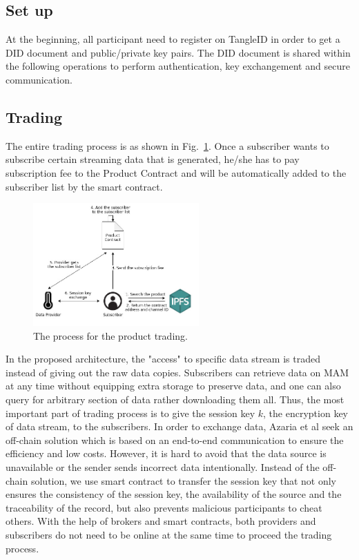 \documentclass[conference]{IEEEtran}
\begin{document}
\subsection{Set up}
At the beginning, all participant need to register on TangleID in order to get a DID document and public/private key pairs. The DID document is shared within the following operations to perform authentication, key exchangement and secure communication. 

\subsection{Trading}
\label{section:trading}

The entire trading process is as shown in Fig.~\ref{fig:trading_product}. Once a subscriber wants to subscribe certain streaming data that is generated, he/she has to pay subscription fee to the Product Contract and will be automatically added to the subscriber list by the smart contract.

\begin{figure}[!t]
    \centering
    \includegraphics[width=2.5in]{trading_product}
    \caption{The process for the product trading.}
    \label{fig:trading_product}
\end{figure}

In the proposed architecture, the "access" to specific data stream is traded instead of giving out the raw data copies. Subscribers can retrieve data on MAM at any time without equipping extra storage to preserve data, and one can also query for arbitrary section of data rather downloading them all. Thus, the most important part of trading process is to give the session key $k$, the encryption key of data stream, to the subscribers. In order to exchange data, Azaria et al\cite{Medrec} seek an off-chain solution which is based on an end-to-end communication to ensure the efficiency and low costs. However, it is hard to avoid that the data source is unavailable or the sender sends incorrect data intentionally. Instead of the off-chain solution, we use smart contract to transfer the session key\cite{3tierDataMarket} that not only ensures the consistency of the session key, the availability of the source and the traceability of the record, but also prevents malicious participants to cheat others. With the help of brokers and smart contracts, both providers and subscribers do not need to be online at the same time to proceed the trading process.
\end{document}
